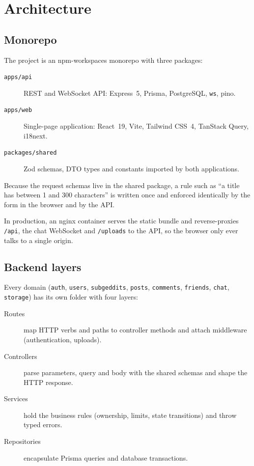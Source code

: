 \documentclass[11pt,a4paper]{article}
\begin{document}
\section{Architecture}

\subsection{Monorepo}

The project is an npm-workspaces monorepo with three packages:

\begin{description}
  \item[\texttt{apps/api}] REST and WebSocket API: Express~5, Prisma, PostgreSQL, \texttt{ws}, pino.
  \item[\texttt{apps/web}] Single-page application: React~19, Vite, Tailwind CSS~4, TanStack Query, i18next.
  \item[\texttt{packages/shared}] Zod schemas, DTO types and constants imported by both applications.
\end{description}

Because the request schemas live in the shared package, a rule such as ``a title has between 1 and 300
characters'' is written once and enforced identically by the form in the browser and by the API.

In production, an nginx container serves the static bundle and reverse-proxies \texttt{/api}, the chat WebSocket
and \texttt{/uploads} to the API, so the browser only ever talks to a single origin.

\subsection{Backend layers}

Every domain (\texttt{auth}, \texttt{users}, \texttt{subgeddits}, \texttt{posts}, \texttt{comments},
\texttt{friends}, \texttt{chat}, \texttt{storage}) has its own folder with four layers:

\begin{description}
  \item[Routes] map HTTP verbs and paths to controller methods and attach middleware (authentication, uploads).
  \item[Controllers] parse parameters, query and body with the shared schemas and shape the HTTP response.
  \item[Services] hold the business rules (ownership, limits, state transitions) and throw typed errors.
  \item[Repositories] encapsulate Prisma queries and database transactions.
\end{description}
\end{document}
